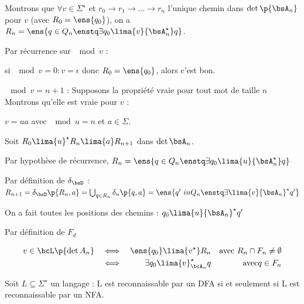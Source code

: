     \begin{nproof}
        Montrons que $\forall v \in \Sigma^\star$ et $r_0 \to r_1 \to \dots \to r_n$ l'unique chemin dans $\det \p{\bsA_n}$ pour $v$ (avec $R_0 = \ens{q_0}$), on a $R_n = \ens{q \in Q_n \enstq \exists q_0 \lima{v}{\bsA_n^\star} q}$.
        
        Par récurrence sur $\mod{v}$ :
        \begin{enumerate}
            \itt si $\mod{v} = 0 : v = \epsilon$ donc $R_0 = \ens{q_0}$, alors c'est bon.
            
            \itt $\mod{v} = n + 1$ : Supposons la propriété vraie pour tout mot de taille $n$ Montrons qu'elle est vraie pour $v$ :
            
            $v = ua$ avec $\mod{u} = n$ et $a \in \Sigma$.
            
            Soit $R_0 \lima{u}^\star R_n \lima{a} R_{n+1}$ dans $ \det{\bsA_n}$.
            
            Par hypothèse de récurrence, $R_n = \ens{q \in Q_n \enstq \exists q_0 \lima{u}{\bsA_n^\star} q}$
            
            Par définition de $\delta_\bsD$ :
            $R_{n+1} = \delta_\bsD \p{R_n, a} = \bigcup_{q \in R_n} \delta_n \p{q, a} = \ens{q' \ in Q_n \enstq \exists \lima{v}{\bsA_n}^\star q'}$
            
            \itt On a fait toutes les positions des chemins : $q_0 \lima{u}{\bsA_n}^\star q'$
        
        
        
            Par définition de $F_d$
            
            \begin{align*}
                v \in \bcL\p{\det{A_n}} &&\iff&& \ens{q_0} \lima{v^\star} R_n &&\text{avec} \ R_n \cap F_n \neq \emptyset\\
                &&\iff&& \exists q_0 \lima{v}^\star_{\bcA_n} q &&\text{avec} q \in F_n
            \end{align*}
            
        \end{enumerate}
    \end{nproof}
    
    \begin{corollary}{}{}
        Soit $L \subseteq \Sigma^\star$ un langage : L est reconnaissable par un DFA si et seulement si L est reconnaissable par un NFA.
    \end{corollary}
    
